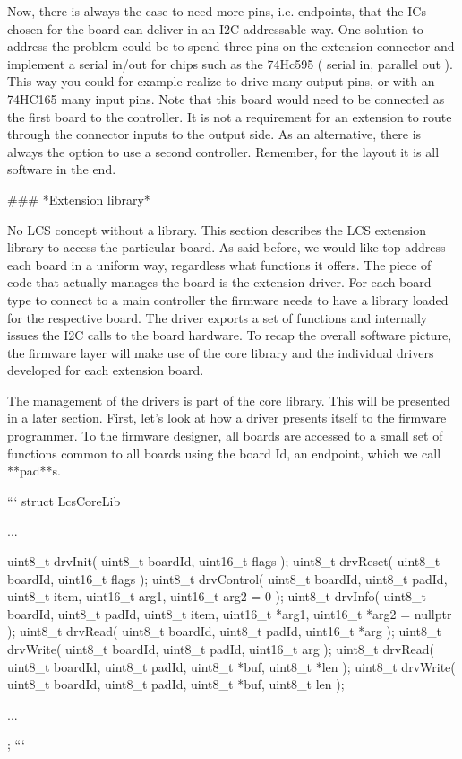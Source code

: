 Now, there is always the case to need more pins, i.e. endpoints, that the ICs chosen for the board can deliver in an I2C addressable way. One solution to address the problem could be to spend three pins on the extension connector and implement a serial in/out for chips such as the 74Hc595 ( serial in, parallel out ). This way you could for example realize to drive many output pins, or with an 74HC165 many input pins. Note that this board would need to be connected as the first board to the controller. It is not a requirement for an extension to route through the connector inputs to the output side. As an alternative, there is always the option to use a second controller. Remember, for the layout it is all software in the end.

### *Extension library*

No LCS concept without a library. This section describes the LCS extension library to access the particular board. As said before, we would like top address each board in a uniform way, regardless what functions it offers. The piece of code that actually manages the board is the extension driver. For each board type to connect to a main controller the firmware needs to have a library loaded for the respective board. The driver exports a set of functions and internally issues the I2C calls to the board hardware. To recap the overall software picture, the firmware layer will make use of the core library and the individual drivers developed for each extension board.

The management of the drivers is part of the core library. This will be presented in a later section. First, let's look at how a driver presents itself to the firmware programmer. To the firmware designer, all boards are accessed to a small set of functions common to all boards using the board Id, an endpoint, which we call **pad**s.

```
struct LcsCoreLib {

   ...

   uint8_t drvInit( uint8_t boardId, uint16_t flags );
   uint8_t drvReset( uint8_t boardId, uint16_t flags );
   uint8_t drvControl( uint8_t boardId, uint8_t padId, uint8_t item, uint16_t arg1, uint16_t arg2 = 0 );
   uint8_t drvInfo( uint8_t boardId, uint8_t padId, uint8_t item, uint16_t *arg1, uint16_t *arg2 = nullptr );
   uint8_t drvRead( uint8_t boardId, uint8_t padId, uint16_t *arg );
   uint8_t drvWrite( uint8_t boardId, uint8_t padId, uint16_t arg );
   uint8_t drvRead( uint8_t boardId, uint8_t padId, uint8_t *buf, uint8_t *len );
   uint8_t drvWrite( uint8_t boardId, uint8_t padId, uint8_t *buf, uint8_t len );

   ...

   };
```

